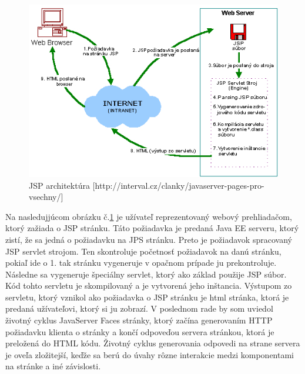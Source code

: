 \begin{figure}[htb]

\begin{center}

\includegraphics[scale=0.5]{architecture.jpg} 
\caption{JSP architektúra [http://interval.cz/clanky/javaserver-pages-pro-vsechny/] }
\label{jsp}

\end{center}

\end{figure}
Na nasledujjúcom obrázku č.\ref{jsp} je užívateľ reprezentovaný webový prehliadačom, ktorý zažiada o JSP stránku. Táto požiadavka je predaná Java EE serveru, ktorý zistí, že sa jedná o požiadavku na JPS stránku. Preto je požiadavok spracovaný JSP servlet strojom. Ten skontroluje početnosť požiadavok na danú stránku, pokiaľ ide o 1. tak stránku vygeneruje v opačnom prípade ju prekontroluje. Následne sa vygeneruje špeciálny servlet, ktorý ako základ použije JSP súbor. Kód tohto servletu je skompilovaný a je vytvorená jeho inštancia. Výstupom zo servletu, ktorý vznikol ako požiadavka o JSP stránku je html stránka, ktorá je predaná užívateľovi, ktorý si ju zobrazí. V poslednom rade by som uviedol životný cyklus JavaServer Faces stránky, ktorý začína generovaním HTTP požiadavku klienta o stránky a končí odpoveďou servera stránkou, ktorá je preložená do HTML kódu.
Životný cyklus generovania odpovedi na strane servera je oveľa zložitejší, keďže sa berú do úvahy rôzne interakcie medzi komponentami na stránke a iné závislosti. 
